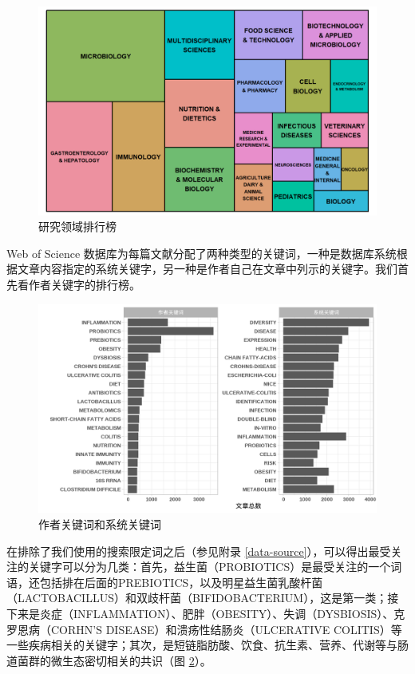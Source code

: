 \documentclass[]{ctexbook}
\begin{document}
\begin{figure}
\includegraphics[width=1\linewidth]{plots/summary-WC-1} \caption{研究领域排行榜}\label{fig:summary-WC}
\end{figure}

Web of Science 数据库为每篇文献分配了两种类型的关键词，一种是数据库系统根据文章内容指定的系统关键字，另一种是作者自己在文章中列示的关键字。我们首先看作者关键字的排行榜。

\begin{figure}
\includegraphics[width=1\linewidth]{plots/summary-keyword-1} \caption{作者关键词和系统关键词}\label{fig:summary-keyword}
\end{figure}

在排除了我们使用的搜索限定词之后（参见附录 \ref{data-source}），可以得出最受关注的关键字可以分为几类：首先，益生菌（PROBIOTICS）是最受关注的一个词语，还包括排在后面的PREBIOTICS，以及明星益生菌乳酸杆菌（LACTOBACILLUS）和双歧杆菌（BIFIDOBACTERIUM），这是第一类；接下来是炎症（INFLAMMATION）、肥胖（OBESITY）、失调（DYSBIOSIS）、克罗恩病（CORHN'S DISEASE）和溃疡性结肠炎（ULCERATIVE COLITIS）等一些疾病相关的关键字；其次，是短链脂肪酸、饮食、抗生素、营养、代谢等与肠道菌群的微生态密切相关的共识（图 \ref{fig:summary-keyword}）。
\end{document}
